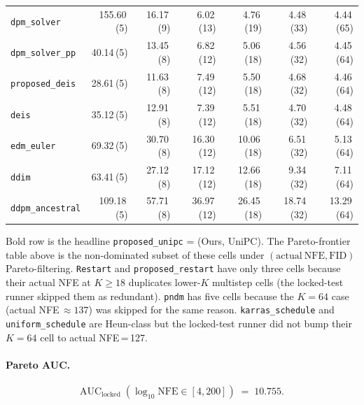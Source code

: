 \documentclass[11pt]{article}
\begin{document}
\begin{center}
\begin{tabular}{l r r r r r r}
\texttt{dpm\_solver}          & 155.60\,\scriptsize(5)  & 16.17\,\scriptsize(9)   & 6.02\,\scriptsize(13)   & 4.76\,\scriptsize(19)  & 4.48\,\scriptsize(33)   & 4.44\,\scriptsize(65)    \\
\texttt{dpm\_solver\_pp}      & 40.14\,\scriptsize(5)   & 13.45\,\scriptsize(8)   & 6.82\,\scriptsize(12)   & 5.06\,\scriptsize(18)  & 4.56\,\scriptsize(32)   & 4.45\,\scriptsize(64)    \\
\texttt{proposed\_deis}       & 28.61\,\scriptsize(5)   & 11.63\,\scriptsize(8)   & 7.49\,\scriptsize(12)   & 5.50\,\scriptsize(18)  & 4.68\,\scriptsize(32)   & 4.46\,\scriptsize(64)    \\
\texttt{deis}                 & 35.12\,\scriptsize(5)   & 12.91\,\scriptsize(8)   & 7.39\,\scriptsize(12)   & 5.51\,\scriptsize(18)  & 4.70\,\scriptsize(32)   & 4.48\,\scriptsize(64)    \\
\texttt{edm\_euler}           & 69.32\,\scriptsize(5)   & 30.70\,\scriptsize(8)   & 16.30\,\scriptsize(12)  & 10.06\,\scriptsize(18) & 6.51\,\scriptsize(32)   & 5.13\,\scriptsize(64)    \\
\texttt{ddim}                 & 63.41\,\scriptsize(5)   & 27.12\,\scriptsize(8)   & 17.12\,\scriptsize(12)  & 12.66\,\scriptsize(18) & 9.34\,\scriptsize(32)   & 7.11\,\scriptsize(64)    \\
\texttt{ddpm\_ancestral}      & 109.18\,\scriptsize(5)  & 57.71\,\scriptsize(8)   & 36.97\,\scriptsize(12)  & 26.45\,\scriptsize(18) & 18.74\,\scriptsize(32)  & 13.29\,\scriptsize(64)   \\
\bottomrule
\end{tabular}
\end{center}

\noindent
Bold row is the headline \texttt{proposed\_unipc} = (Ours, UniPC).
The Pareto-frontier table above is the non-dominated subset of these
cells under \((\mathrm{actual\ NFE}, \mathrm{FID})\) Pareto-filtering.
\texttt{Restart} and \texttt{proposed\_restart} have only three cells
because their actual NFE at \(K\ge 18\) duplicates lower-\(K\)
multistep cells (the locked-test runner skipped them as redundant).
\texttt{pndm} has five cells because the \(K{=}64\) case (actual
NFE\,\(\approx 137\)) was skipped for the same reason. \texttt{karras\_schedule}
and \texttt{uniform\_schedule} are Heun-class but the locked-test
runner did not bump their \(K{=}64\) cell to actual NFE\,=\,127.

\paragraph{Pareto AUC.}
\[
\mathrm{AUC}_{\mathrm{locked}}\;(\log_{10}\mathrm{NFE} \in [4, 200]) \;=\; 10.755.
\]
\end{document}
